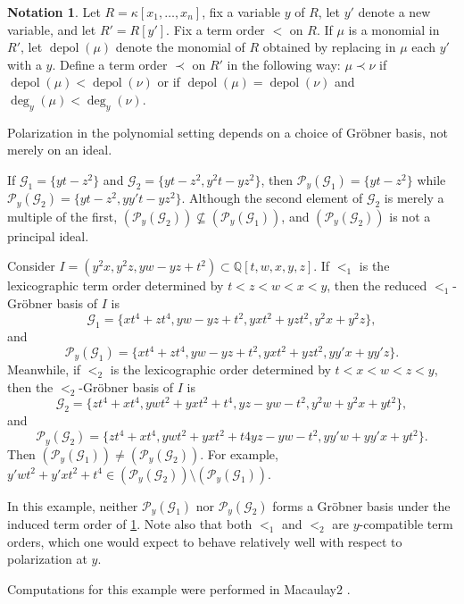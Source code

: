 \documentclass[12pt, reqno]{amsart}
\numberwithin{equation}{section}
\newtheorem{Main Conjecture}[theorem]{Main Conjecture}
\theoremstyle{definition}
\newenvironment{example}
  {\pushQED{\qed}\renewcommand{\qedsymbol}{$\diamondsuit$}\examplex}
  {\popQED\endexamplex}
\newtheorem{notation}[theorem]{Notation}
\theoremstyle{plain}
\newcommand{\QQ}{\mathbb{Q}}
\newcommand{\G}{\mathcal{G}}
\renewcommand{\P}{\mathcal{P}}
\DeclareMathOperator{\depol}{depol}
\begin{document}
\begin{notation}\label{not:indOrder} Let $R = \kappa[x_1, \ldots, x_n]$, fix a variable $y$ of $R$, let $y'$ denote a new variable, and let $R' = R[y']$.  Fix a term order $<$ on $R$.  If $\mu$ is a monomial in $R'$, let $\depol(\mu)$ denote the monomial of $R$ obtained by replacing in $\mu$ each $y'$ with a $y$. Define a term order $\prec$ on $R'$ in the following way: $\mu \prec \nu$ if $\depol(\mu)<\depol(\nu)$ or if $\depol(\mu)=\depol(\nu)$ and $\deg_{y}(\mu)<\deg_y(\nu)$.
\end{notation}

Polarization in the polynomial setting depends on a choice of Gr\"obner basis, not merely on an ideal.

\begin{example}\label{ex:redundant-gens-polarization-not-GB}
If $\G_1 = \{yt-z^2\}$ and $\G_2 = \{yt-z^2, y^2t-yz^2\}$, then $\P_{y}(\G_1) = \{yt-z^2\}$ while $\P_{y}(\G_2) = \{yt-z^2,yy't-yz^2\}$.  Although the second element of $\G_2$ is merely a multiple of the first, $(\P_{y}(\G_2)) \not\subseteq (\P_{y}(\G_1))$, and $(\P_{y}(\G_2))$ is not a principal ideal.
\end{example}



\begin{example}\label{ex:termOrderDependent}
    Consider $I = (y^2x,y^2z,yw-yz+t^2) \subset \QQ[t,w,x,y,z]$.  If $<_1$ is the lexicographic term order determined by $t<z<w<x<y$, then the reduced $<_1$-Gr\"obner basis of $I$ is \[
    \G_1 = \{xt^4+zt^4, yw-yz+t^2, yxt^2+yzt^2, y^2x+y^2z\},
    \] and \[
    \P_y(\G_1) = \{xt^4+zt^4, yw-yz+t^2, yxt^2+yzt^2, yy'x+yy'z\}.
    \] Meanwhile, if $<_2$ is the lexicographic order determined by $t<x<w<z<y$, then the $<_2$-Gr\"obner basis of $I$ is 
    \[
    \G_2 = \{zt^4+xt^4, ywt^2+yxt^2+t^4, yz-yw-t^2, y^2w+y^2x+yt^2\},
    \] and \[
    \P_y(\G_2) = \{zt^4+xt^4, ywt^2+yxt^2+t4 yz-yw-t^2, yy'w+yy'x+yt^2\}.
    \] Then $(\P_y(\G_1)) \neq (\P_y(\G_2))$.  For example, $y'wt^2+y'xt^2+t^4 \in (\P_y(\G_2)) \setminus (\P_y(\G_1))$. 
    
    In this example, neither $\P_y(\G_1)$ nor $\P_y(\G_2)$ forms a Gr\"obner basis under the induced term order of \cref{not:indOrder}.  Note also that both $<_1$ and $<_2$ are $y$-compatible term orders, which one would expect to behave relatively well with respect to polarization at $y$.  

        Computations for this example were performed in Macaulay2 \cite{M2}.
\end{example}
\end{document}
